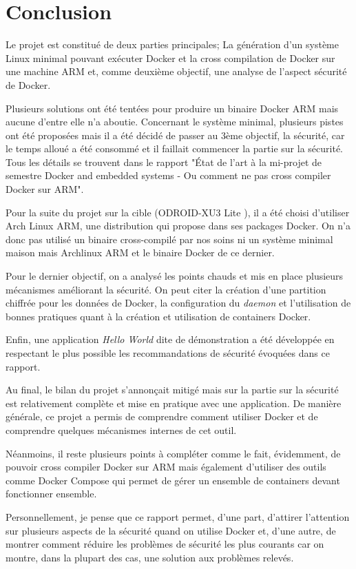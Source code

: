 \documentclass[11pt,a4paper,oneside]{report}
\newcommand{\oldreportname}{État de l’art à la mi-projet de semestre Docker and embedded systems - Ou comment ne pas cross compiler Docker sur ARM}
\newcommand{\odroid}{ODROID-XU3 Lite }
\begin{document}
\chapter{Conclusion}
Le projet est constitué de deux parties principales; La génération d'un système Linux minimal pouvant exécuter Docker et la cross compilation de Docker sur une machine ARM et, comme deuxième objectif, une analyse de l'aspect sécurité de Docker.

Plusieurs solutions ont été tentées pour produire un binaire Docker ARM mais aucune d'entre elle n'a aboutie. Concernant le système minimal, plusieurs pistes ont été proposées mais il a été décidé de passer au 3ème objectif, la sécurité, car le temps alloué a été consommé et il faillait commencer la partie sur la sécurité. Tous les détails se trouvent dans le rapport "\oldreportname".

Pour la suite du projet sur la cible (\odroid), il a été choisi d'utiliser Arch Linux ARM, une distribution qui propose dans ses packages Docker. On n'a donc pas utilisé un binaire cross-compilé par nos soins ni un système minimal maison mais Archlinux ARM et le binaire Docker de ce dernier.

Pour le dernier objectif, on a analysé les points chauds et mis en place plusieurs mécanismes améliorant la sécurité. On peut citer la création d'une partition chiffrée pour les données de Docker, la configuration du \textit{daemon} et l'utilisation de bonnes pratiques quant à la création et utilisation de containers Docker.

Enfin, une application \textit{Hello World} dite de démonstration a été développée en respectant le plus possible les recommandations de sécurité évoquées dans ce rapport.

Au final, le bilan du projet s'annonçait mitigé mais sur la partie sur la sécurité est relativement complète et mise en pratique avec une application. De manière générale, ce projet a permis de comprendre comment utiliser Docker et de comprendre quelques mécanismes internes de cet outil.

Néanmoins, il reste plusieurs points à compléter comme le fait, évidemment, de pouvoir cross compiler Docker sur ARM mais également d'utiliser des outils comme Docker Compose qui permet de gérer un ensemble de containers devant fonctionner ensemble.

Personnellement, je pense que ce rapport permet, d'une part, d'attirer l'attention sur plusieurs aspects de la sécurité quand on utilise Docker et, d'une autre, de montrer comment réduire les problèmes de sécurité les plus courants car on montre, dans la plupart des cas, une solution aux problèmes relevés.
\end{document}
